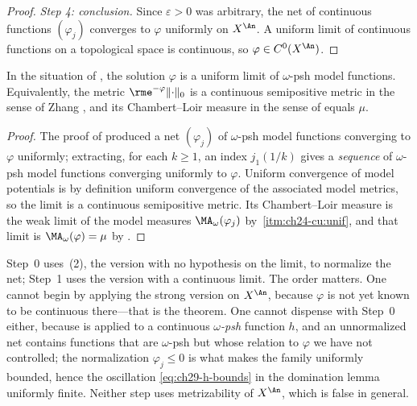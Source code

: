 \begin{proof}
\emph{Step 4: conclusion.}  Since \(\varepsilon>0\) was arbitrary, the net
of continuous functions \((\varphi_j)\) converges to \(\varphi\) uniformly
on \(X^{\An}\).  A uniform limit of continuous functions on a topological
space is continuous, so \(\varphi\in C^0(X^{\An})\).
\end{proof}

\begin{corollary}
\label{cor:ch29-uniform-model-limit}
In the situation of , the solution
\(\varphi\) is a uniform limit of \(\omega\)-psh model functions.
Equivalently, the metric \(\rme^{-\varphi}\lVert\cdot\rVert_0\) is a
continuous semipositive metric in the sense of Zhang
\cite{Zhang1995}, and its Chambert--Loir measure in the sense of
\cite{CL06} equals \(\mu\).
\end{corollary}

\begin{proof}
The proof of  produced a net
\((\varphi_j)\) of \(\omega\)-psh model functions converging to
\(\varphi\) uniformly; extracting, for each \(k\geq1\), an index
\(j_1(1/k)\) gives a \emph{sequence} of \(\omega\)-psh model functions
converging uniformly to \(\varphi\).  Uniform convergence of model
potentials is by definition uniform convergence of the associated model
metrics, so the limit is a continuous semipositive metric.  Its
Chambert--Loir measure is the weak limit of the model measures
\(\MA_\omega(\varphi_j)\) by
\,\cref{itm:ch24-cu:unif}, and that limit
is \(\MA_\omega(\varphi)=\mu\) by .
\end{proof}

\begin{remark}
\label{rem:ch29-two-dinis}
Step~0 uses \,(2), the version with no hypothesis on the
limit, to normalize the net; Step~1 uses the version with a continuous
limit.  The order matters.  One cannot begin by applying the strong version
on \(X^{\An}\), because \(\varphi\) is not yet known to be continuous
there---that is the theorem.  One cannot dispense with Step~0 either,
because  is applied to a continuous
\emph{\(\omega\)-psh} function \(h\), and an unnormalized net contains
functions that are \(\omega\)-psh but whose relation to
\(\varphi\) we have not controlled; the normalization
\(\varphi_j\leq0\) is what makes the family uniformly bounded, hence the
oscillation \eqref{eq:ch29-h-bounds} in the domination lemma uniformly
finite.  Neither step uses metrizability of \(X^{\An}\), which is false in
general.
\end{remark}

